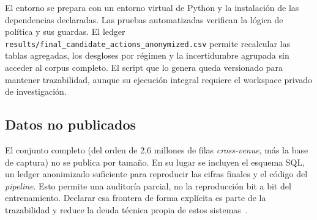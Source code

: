 El entorno se prepara con un entorno virtual de Python y la instalación de las dependencias
declaradas. Las pruebas automatizadas verifican la lógica de política y sus guardas. El ledger
\texttt{results/final\_candidate\_actions\_anonymized.csv} permite recalcular las tablas
agregadas, los desgloses por régimen y la incertidumbre agrupada sin acceder al corpus
completo. El script que lo genera queda versionado para mantener trazabilidad, aunque su
ejecución integral requiere el workspace privado de investigación.

\subsection{Datos no publicados}

El conjunto completo (del orden de 2,6 millones de filas \emph{cross-venue}, más la base de
captura) no se publica por tamaño. En su lugar se incluyen el esquema SQL, un ledger
anonimizado suficiente para reproducir las cifras finales y el código del \emph{pipeline}.
Esto permite una auditoría parcial, no la reproducción bit a bit del entrenamiento. Declarar
esa frontera de forma explícita es parte de la trazabilidad y reduce la deuda técnica propia de
estos sistemas~\cite{sculley2015debt}.
